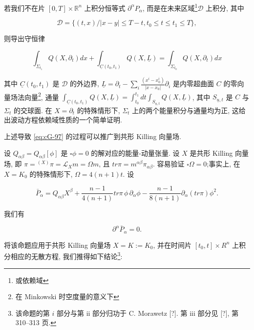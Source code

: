 若我们不在片 $[0, T]\times \mathbb{R}^n$ 上积分恒等式 $\partial^{\alpha}P_{\alpha}$, 而是在未来区域\footnote{或依赖域}$\mathcal{D}$ 上积分, 其中

\[
\mathcal {D} = \{(t,  x) / | x - y | \leq T - t,  t _ {0} \leq t \leq t _ {1} \leq T \}, 
\]

则导出守恒律

\begin{equation}
\int_{\Sigma_{t_{1}}} Q(X,  \partial_{t}) dx + \int_{\underline{C}(t_{0},  t_{1})} Q(X,  \underline{L}) = \int_{\Sigma_{t_{0}}} Q(X,  \partial_{t}) dx\label{eq:cG-98}
\end{equation}

其中 $\underline{C}(t_{0}, t_{1})$ 是 $\mathcal{D}$ 的外边界, $\underline{L}=\partial_{t}-\sum_{i}\frac{(x^{i}-x_{0}^{i})}{|x-x_{0}|}\partial_{i}$ 是内零超曲面 $C$ 的零向量场法向量\footnote{在 Minkowski 时空度量的意义下}, 通量 $\int_{\underline{C}(t_{0}, t_{1})}Q(X, \underline{L})=\int_{t_{0}}^{t_{1}}dt\int_{S_{\underline{u}, t}}Q(X, \underline{L})$, 其中 $S_{\underline{u}, t}$ 是 $C$ 与 $\Sigma_{t}$ 的交球面. 在 $X=\partial_{t}$ 的特殊情形下, $\Sigma_{t}$ 上的两个能量积分与通量均为正, 这给出波动方程依赖域性质的一个简单证明. 

上述导致 \eqref{eq:cG-97} 的过程可以推广到共形 Killing 向量场. 

\begin{proposition}\label{prop:cG-4.10}
设 $Q_{\alpha\beta} = Q_{\alpha\beta}[\phi]$ 是 $\square\phi = 0$ 的解对应的能量-动量张量. 设 $X$ 是共形 Killing 向量场, 即 $\pi = {}^{(X)}\pi = \mathcal{L}_Xm = \Omega m$, 且 $tr\pi = m^{\alpha\beta}\pi_{\alpha\beta}$. 容易验证 $\square\Omega = 0$;事实上, 在 $X = K_0$ 的特殊情形下, $\Omega = 4(n + 1)t$. 设

\[
\bar {P} _ {\alpha} = Q _ {\alpha\beta} X^{\beta} + \frac {n - 1}{4 (n + 1)} tr\pi\, \phi\, \partial_{\alpha}\phi - \frac {n - 1}{8 (n + 1)}\partial_{\alpha}(tr\pi)\phi^{2}.
\]

我们有

\[
\partial^{\alpha}\bar {P} _ {\alpha} = 0.
\]
\end{proposition}

将该命题应用于共形 Killing 向量场 $X = K := K_{0}$, 并在时间片 $[t_{0},  t] \times R^{n}$ 上积分相应的无散方程, 我们推得如下结论\footnote{该命题的第 $i$ 部分与第 ii 部分归功于 C. Morawetz [?]. 第 iii 部分见 [?], 第 310--313 页. }:

